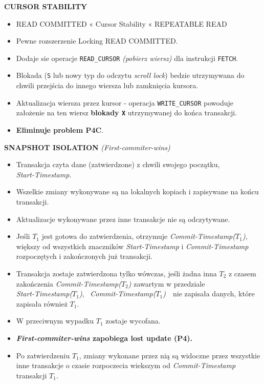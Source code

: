 \textbf{CURSOR STABILITY}
\begin{itemize}
    \item READ COMMITTED « Cursor Stability « REPEATABLE READ
    \item Pewne rozszerzenie Locking READ COMMITTED.
    \item Dodaje sie operacje \texttt{READ\_CURSOR}
    \textit{(pobierz wiersz)} dla instrukcji \texttt{FETCH}.
    \item Blokada (\texttt{S} lub nowy typ do odczytu \textit{scroll lock})
    bedzie utrzymywana do\\ chwili przejścia do innego wiersza lub
    zamknięcia kursora.
    \item Aktualizacja wiersza przez kursor - operacja
    \texttt{WRITE\_CURSOR} powoduje\\ założenie na ten wiersz
    \textbf{blokady \texttt{X}} utrzymywanej do końca transakcji.
    \item \textbf{Eliminuje problem P4C}.
\end{itemize}

\textbf{SNAPSHOT ISOLATION} \textit{(First-commiter-wins)}
\begin{itemize}
    \item Transakcja czyta dane (zatwierdzone) z chwili swojego początku,\\
    \textit{Start-Timestamp}.
    \item Wszelkie zmiany wykonywane są na lokalnych kopiach i zapisywane
    na końcu transakcji.
    \item Aktualizacje wykonywane przez inne transakcje nie są odczytywane.
    \item Jeśli $T_1$ jest gotowa do zatwierdzenia, otrzymuje
    \textit{Commit-Timestamp($T_1$)}, większy od wszystkich znaczników
    \textit{Start-Timestamp} i \textit{Commit-Timestamp}\\
    rozpoczętych i zakończonych już transakcji.
    \item Transakcja zostaje zatwierdzona tylko wówczas, jeśli żadna inna
    $T_2$
    z czasem zakończenia \textit{Commit-Timestamp($T_2$)} zawartym w
    przedziale\\
    \lbrack\textit{Start-Timestamp($T_1$)},~
    \textit{Commit-Timestamp($T_1$)}\rbrack~~nie zapisała danych,
    które zapisała również $T_1$.
    \item W przeciwnym wypadku $T_1$ zostaje wycofana.
    \item \textbf{\textit{First-commiter-wins} zapobiega lost update (P4).}
    \item Po zatwierdzeniu $T_1$, zmiany wykonane przez nią są widoczne
    przez wszystkie inne transakcje o czasie rozpoczecia wiekszym od
    \textit{Commit-Timestamp} transakcji $T_1$.
\end{itemize}

